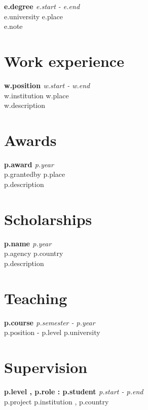 \documentclass[10pt,letterpaper]{article} %
\newcommand{\cventry}[4]{ {\bf #1} \hfill {\em #2} \\ {\small \sc #3 \hfill  #4} }
\begin{document}
{%
    \cventry{ {{ e.degree }} }
    { {{ e.start }} - {{ e.end }} }
    { {{ e.university }} }
    { {{ e.place}} } \\
    {{ e.note }}
{%


\section*{Work experience} %

{%
    \cventry{ {{ w.position }} }
    { {{ w.start }} -   {{ w.end }} }
    { {{ w.institution }} }
    { {{ w.place }} }\\
    {{ w.description }}
{%

\section*{Awards}

{%
    \cventry{ {{ p.award }} }
    { {{ p.year }} }
    { {{ p.grantedby }} }
    { {{p.place}} }\\
    {{ p.description }}
{%

\section*{Scholarships}

{%
    \cventry{ {{ p.name }} }
    { {{ p.year }} }
    { {{ p.agency }} }
    { {{ p.country }} } \\
    {{ p.description }}
{%

\section*{Teaching}

{%
    \cventry{ {{  p.course }}  }
    { {{ p.semester }} - {{ p.year }}  }
    { {{ p.position }}  - {{ p.level }} }
    { {{ p.university }}  } \\ {%

\newpage

\section*{Supervision}

{%
\cventry{ {{ p.level }}, {{ p.role }}: {{ p.student }}  }
{ {{ p.start }} - {{p.end}} }
{ {{ p.project }} }
{ {{ p.institution }}, {{ p.country }} } \\ {%


}}}}}}}}}}}}
\end{document}
